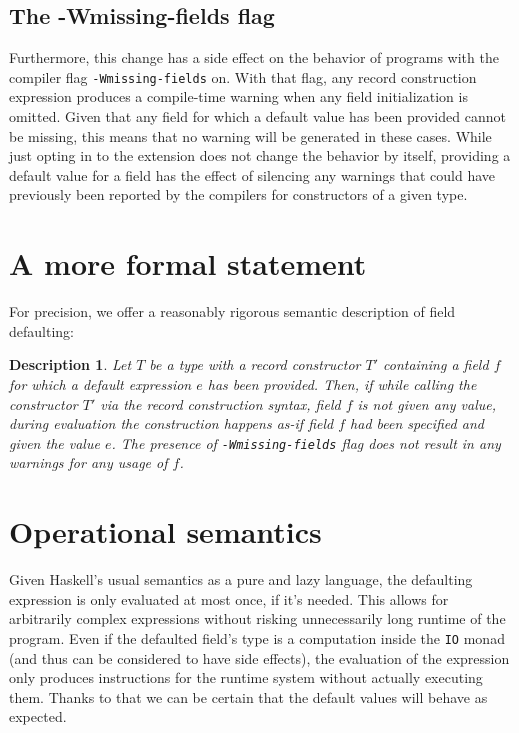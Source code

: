 \documentclass[en]{pracamgr}
\newcommand{\code}[1]{\lstinline[breaklines=true]{#1}}
\begin{document}
\subsection{The -Wmissing-fields flag}
Furthermore, this change has a side effect on the behavior of programs with the compiler flag \code{-Wmissing-fields} on.
With that flag, any record construction expression produces a compile-time warning when any field initialization is omitted.
Given that any field for which a default value has been provided cannot be missing, this means that no warning will be 
generated in these cases.
While just opting in to the extension does not change the behavior by itself, providing a default value for a field
has the effect of silencing any warnings that could have previously been reported by the compilers for constructors 
of a given type.

\section{A more formal statement}
For precision, we offer a reasonably rigorous semantic description of field defaulting:
\newtheorem{remark}{Description}
\begin{remark}
  \normalfont
  Let $T$ be a type with a record constructor $T'$ containing a field $f$ for which a default expression $e$ has been provided.
  Then, if while calling the constructor $T'$ via the record construction syntax, field $f$ is not given any value, 
  during evaluation the construction happens \textit{as-if} field $f$ had been specified and given the value $e$.
  The presence of \code{-Wmissing-fields} flag does not result in any warnings for any usage of $f$.
\end{remark}

\section{Operational semantics}
Given Haskell's usual semantics as a pure and lazy language, the defaulting expression is only evaluated at most once, if it's needed.
This allows for arbitrarily complex expressions without risking unnecessarily long runtime of the program. 
Even if the defaulted field's type is a computation inside the \code{IO} monad (and thus can be considered to have side effects), the evaluation of the expression only produces instructions for the runtime system without actually executing them.
Thanks to that we can be certain that the default values will behave as expected.
\end{document}
